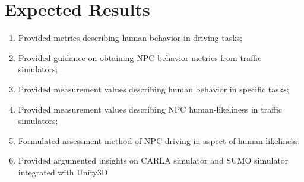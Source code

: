 \documentclass{VUMIFPS-master-intro}
\begin{document}
\section{Expected Results}

%

\begin{enumerate}
	\item Provided metrics describing human behavior in driving tasks;
	\item Provided guidance on obtaining NPC behavior metrics from traffic simulators;
	\item Provided measurement values describing human behavior in specific tasks;
	\item Provided measurement values describing NPC human-likeliness in traffic simulators;
	\item Formulated assessment method of NPC driving in aspect of human-likeliness;
	\item Provided argumented insights on CARLA simulator and SUMO simulator integrated with Unity3D.
\end{enumerate}









\printbibliography[heading=bibintoc]




\end{document}

